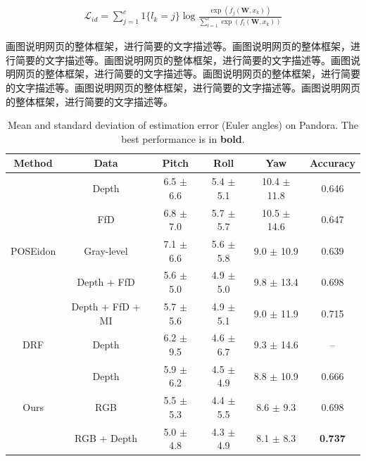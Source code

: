 \documentclass[supercite]{HustGraduPaper}
\theoremstyle{definition}
\begin{document}
    \begin{eqnarray}
        \label{equ_loss}
        \mathcal{L}_{id}=\sum_{j=1}^{c}1\{l_k=j\}\log\frac{\exp(f_j(\textbf{W},x_k))}{\sum\nolimits_{l=1}^{c}\exp(f_l(\textbf{W},x_k))}
    \end{eqnarray}

    画图说明网页的整体框架，进行简要的文字描述等。画图说明网页的整体框架，进行简要的文字描述等。画图说明网页的整体框架，进行简要的文字描述等。画图说明网页的整体框架，进行简要的文字描述等。画图说明网页的整体框架，进行简要的文字描述等。画图说明网页的整体框架，进行简要的文字描述等。画图说明网页的整体框架，进行简要的文字描述等。

    \begin{table}
        \begin{center}
            \setlength{\tabcolsep}{2.0mm}
            \caption{Mean and standard deviation of estimation error (Euler angles) on Pandora. The best performance is in \textbf{bold}.}
            \label{table2}
            \begin{tabular}{c|ccccc}
                \hline
                Method                    & Data             & Pitch         & Roll          & Yaw             & Accuracy       \\
                \hline
                \hline
                \multirow{5}{*}{POSEidon} & Depth            & 6.5 $\pm$ 6.6 & 5.4 $\pm$ 5.1 & 10.4 $\pm$ 11.8 & 0.646          \\
                & FfD              & 6.8 $\pm$ 7.0 & 5.7 $\pm$ 5.7 & 10.5 $\pm$ 14.6 & 0.647          \\
                & Gray-level       & 7.1 $\pm$ 6.6 & 5.6 $\pm$ 5.8 & 9.0  $\pm$ 10.9   & 0.639          \\
                & Depth + FfD      & 5.6 $\pm$ 5.0 & 4.9 $\pm$ 5.0 & 9.8  $\pm$ 13.4   & 0.698          \\
                & Depth + FfD + MI & 5.7 $\pm$ 5.6 & 4.9 $\pm$ 5.1 & 9.0  $\pm$ 11.9   & 0.715          \\
                \hline
                DRF                       & Depth            & 6.2 $\pm$ 9.5 & 4.6 $\pm$ 6.7 & 9.3  $\pm$ 14.6   & --             \\
                \hline
                \multirow{3}{*}{Ours}     & Depth            & 5.9 $\pm$ 6.2 & 4.5 $\pm$ 4.9 & 8.8  $\pm$ 10.9   & 0.666          \\
                & RGB              & 5.5 $\pm$ 5.3 & 4.4 $\pm$ 5.5 & 8.6  $\pm$ 9.3    & 0.698          \\
                & RGB + Depth      & 5.0 $\pm$ 4.8 & 4.3 $\pm$ 4.9 & 8.1  $\pm$ 8.3    & \textbf{0.737} \\
                \hline
            \end{tabular}
        \end{center}
    \end{table}
    \newpage
\end{document}

